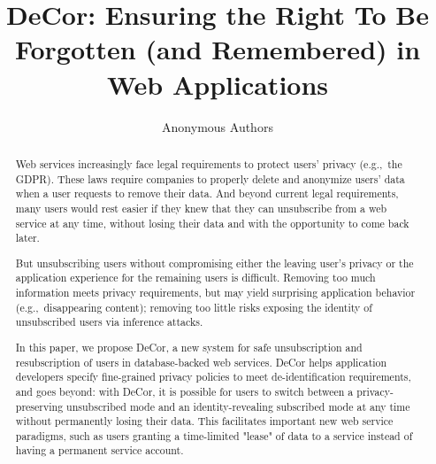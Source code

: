 \documentclass[letterpaper,twocolumn,10pt]{article}
\newcommand{\sys}{DeCor}
\begin{document}

\date{}

\title{\Large \bf \sys{}: Ensuring the Right To Be Forgotten (and Remembered) in Web Applications}


\author{
{\rm Anonymous Authors}\\
} %

\maketitle

\begin{abstract}
Web services increasingly face legal requirements to protect users' privacy (e.g.,\ the GDPR). These
    laws require companies to properly delete and anonymize users’ data when a user requests to
    remove their data. And beyond current legal requirements, many users would rest easier if they
    knew that they can unsubscribe from a web service at any time, without losing their data and
    with the opportunity to come back later.

    But unsubscribing users without compromising either the leaving user's privacy or the application
    experience for the remaining users is difficult. Removing too much information meets privacy
    requirements, but may yield surprising application behavior (e.g.,\ disappearing content);
    removing too little risks exposing the identity of unsubscribed users via inference attacks.

    In this paper, we propose \sys{}, a new system for safe unsubscription and resubscription of
    users in database-backed web services. \sys{} helps application developers specify fine-grained
    privacy policies to meet de-identification requirements, and goes beyond: with \sys{}, it is
    possible for users to switch between a privacy-preserving unsubscribed mode and an
    identity-revealing subscribed mode at any time without permanently losing their data. This
    facilitates important new web service paradigms, such as users granting a time-limited "lease"
    of data to a service instead of having a permanent service account.  
\end{abstract}
\end{document}
